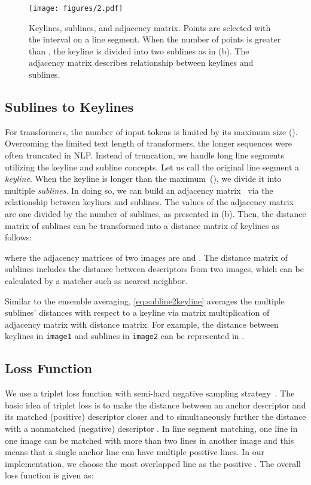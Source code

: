 \documentclass[letterpaper, 10 pt, journal, twoside]{ieeetran}
\begin{document}
\begin{figure}[!t]
	\centering
	\texttt{[image: figures/2.pdf]}
	\caption{Keylines, sublines, and adjacency matrix. Points are selected with the interval  on a line segment. When the number of points  is greater than , the keyline is divided into two sublines as in (b). The adjacency matrix describes relationship between keylines and sublines.}
  \label{fig:adjacency_matrix}
	\vspace{-5mm}
\end{figure}


\subsection{Sublines to Keylines}

For transformers, the number of input tokens is limited by its maximum size (). Overcoming the limited text length of transformers, the longer sequences were often truncated in NLP.
Instead of truncation, we handle long line segments utilizing the keyline and subline concepts. Let us call the original line segment a \textit{keyline}. When the keyline is longer than the maximum~(), we divide it into multiple \textit{sublines}. In doing so, we can build an adjacency matrix~ via the relationship between keylines and sublines. The values of the adjacency matrix are one divided by the number of sublines, as presented in (b). Then, the distance matrix of sublines  can be transformed into a distance matrix of keylines  as follows:

where the adjacency matrices of two images are  and . The distance matrix of sublines includes the distance between descriptors from two images, which can be calculated by a matcher such as nearest neighbor.

Similar to the ensemble averaging, \eqref{eq:subline2keyline} averages the multiple sublines' distances with respect to a keyline via matrix multiplication of adjacency matrix with distance matrix. For example, the distance between keylines in \texttt{image1} and sublines in \texttt{image2} can be represented in .


\subsection{Loss Function}

We use a triplet loss function with semi-hard negative sampling strategy~\cite{Schroff2015}. The basic idea of triplet loss is to make the distance between an anchor descriptor  and its matched (positive) descriptor  closer and to simultaneously further the distance with a nonmatched (negative) descriptor . In line segment matching, one line in one image can be matched with more than two lines in another image and this means that a single anchor line can have multiple positive lines. In our implementation, we choose the most overlapped line as the positive . The overall loss function is given as:
\end{document}

